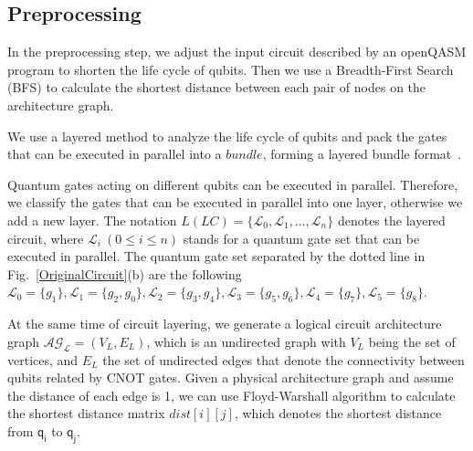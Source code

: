 \documentclass[journal]{IEEEtran}
\begin{document}
	\subsection{Preprocessing}
	In the preprocessing step, we adjust the input circuit described by an openQASM program to shorten the life cycle of qubits. Then we use a Breadth-First Search (BFS) to calculate the shortest distance between each pair of nodes on the architecture graph.
	
	We use a layered method to analyze the life cycle of qubits and pack the gates that can be executed in parallel into a $bundle$, forming a layered bundle format~\cite{2019Zhang}.
	
	Quantum gates acting on different qubits can be executed in parallel. Therefore, we classify the gates that can be executed in parallel into one layer, otherwise we add a new layer. The notation $L(LC)=\{\mathcal{L}_{0},\mathcal{L}_{1},...,\mathcal{L}_{n}\}$ denotes the layered circuit, where $\mathcal{L}_{i} \ (0 \le i \le n) $ stands for a quantum gate set that can be executed in parallel. The quantum gate set separated by the dotted line in Fig.~\ref{OriginalCircuit}(b) are the following $\mathcal{L}_{0}=\{g_{1}\},\mathcal{L}_{1}=\{g_{2},g_{0}\},
	\mathcal{L}_{2}=\{g_{3},g_{4}\},\mathcal{L}_{3}=\{g_{5},g_{6}\},\mathcal{L}_{4}=\{g_{7}\},\mathcal{L}_{5}=\{g_{8}\}$.
	
	At the same time of circuit layering, we generate a logical circuit architecture graph $\mathcal{AG_{L}}=(V_{L},E_{L})$, which is an undirected graph with $V_{L}$ being the set of vertices, and $E_{L}$  the set of undirected edges that denote the connectivity between qubits related by CNOT gates.
	Given a physical architecture graph and assume the distance of each edge is 1, we can use Floyd-Warshall algorithm to calculate the shortest distance matrix $dist[i][j]$, which denotes the shortest distance from $\textsf{q}_{\textsf{i}}$ to $\textsf{q}_{\textsf{j}}$. 
	
\end{document}
